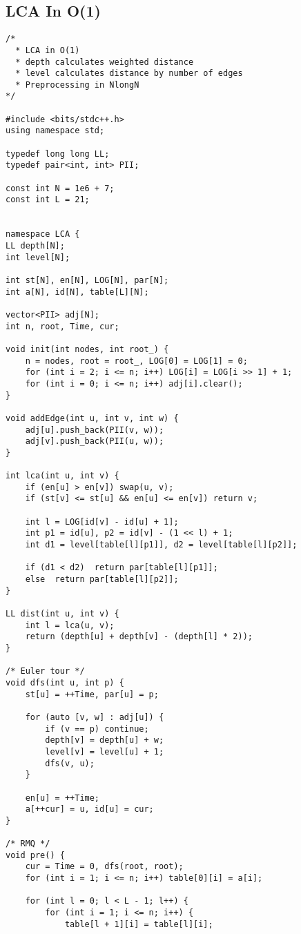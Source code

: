 \documentclass[FSZ,a4paper,onesided]{article}
\begin{document}
\begin{multicols*}{\COLS}
\subsection{LCA In O(1)}
\begin{lstlisting}
/* 
  * LCA in O(1)
  * depth calculates weighted distance  
  * level calculates distance by number of edges
  * Preprocessing in NlongN
*/

#include <bits/stdc++.h>
using namespace std;

typedef long long LL;
typedef pair<int, int> PII;

const int N = 1e6 + 7;
const int L = 21;


namespace LCA {
LL depth[N];
int level[N];  

int st[N], en[N], LOG[N], par[N];
int a[N], id[N], table[L][N];

vector<PII> adj[N];
int n, root, Time, cur;

void init(int nodes, int root_) {
    n = nodes, root = root_, LOG[0] = LOG[1] = 0;
    for (int i = 2; i <= n; i++) LOG[i] = LOG[i >> 1] + 1;
    for (int i = 0; i <= n; i++) adj[i].clear();
}

void addEdge(int u, int v, int w) {
    adj[u].push_back(PII(v, w));
    adj[v].push_back(PII(u, w));
}

int lca(int u, int v) {
    if (en[u] > en[v]) swap(u, v);
    if (st[v] <= st[u] && en[u] <= en[v]) return v;

    int l = LOG[id[v] - id[u] + 1];
    int p1 = id[u], p2 = id[v] - (1 << l) + 1;
    int d1 = level[table[l][p1]], d2 = level[table[l][p2]];

    if (d1 < d2)  return par[table[l][p1]];
    else  return par[table[l][p2]];
}

LL dist(int u, int v) {
    int l = lca(u, v);
    return (depth[u] + depth[v] - (depth[l] * 2));
}

/* Euler tour */
void dfs(int u, int p) {
    st[u] = ++Time, par[u] = p;

    for (auto [v, w] : adj[u]) {
        if (v == p) continue;
        depth[v] = depth[u] + w;
        level[v] = level[u] + 1;
        dfs(v, u);
    }

    en[u] = ++Time;
    a[++cur] = u, id[u] = cur;
}

/* RMQ */
void pre() {
    cur = Time = 0, dfs(root, root);
    for (int i = 1; i <= n; i++) table[0][i] = a[i];

    for (int l = 0; l < L - 1; l++) {
        for (int i = 1; i <= n; i++) {
            table[l + 1][i] = table[l][i];


\end{lstlisting}
\end{multicols*}
\end{document}
